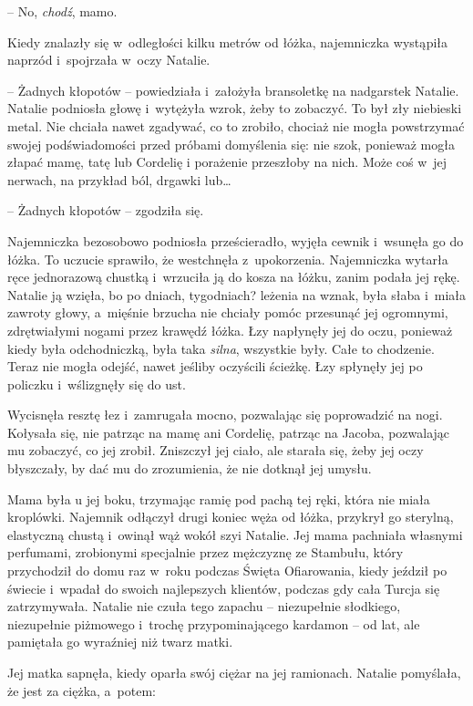 \documentclass[oneside,polish,11pt,sfheadings]{mwbk}
\begin{document}
-- No, \textit{chodź}, mamo.

Kiedy znalazły się w~odległości kilku metrów od łóżka, najemniczka
wystąpiła naprzód i~spojrzała w~oczy Natalie.

-- Żadnych kłopotów -- powiedziała i~założyła bransoletkę na nadgarstek
Natalie. Natalie podniosła głowę i~wytężyła wzrok, żeby to zobaczyć. To
był zły niebieski metal. Nie chciała nawet zgadywać, co to zrobiło,
chociaż nie mogła powstrzymać swojej podświadomości przed próbami
domyślenia się: nie szok, ponieważ mogła złapać mamę, tatę lub Cordelię
i porażenie przeszłoby na nich. Może coś w~jej nerwach, na przykład ból,
drgawki lub\ldots 

-- Żadnych kłopotów -- zgodziła się. 

Najemniczka bezosobowo podniosła
prześcieradło, wyjęła cewnik i~wsunęła go do łóżka. To uczucie sprawiło,
że westchnęła z~upokorzenia. Najemniczka wytarła ręce jednorazową
chustką i~wrzuciła ją do kosza na łóżku, zanim podała jej rękę. Natalie
ją wzięła, bo po dniach, tygodniach? leżenia na wznak, była słaba i~miała zawroty głowy, a~mięśnie brzucha nie chciały pomóc przesunąć jej
ogromnymi, zdrętwiałymi nogami przez krawędź łóżka. Łzy napłynęły jej do
oczu, ponieważ kiedy była odchodniczką, była taka \textit{silna},
wszystkie były. Całe to chodzenie. Teraz nie mogła odejść, nawet jeśliby
oczyścili ścieżkę. Łzy spłynęły jej po policzku i~wślizgnęły się do ust.

Wycisnęła resztę łez i~zamrugała mocno, pozwalając się poprowadzić na
nogi. Kołysała się, nie patrząc na mamę ani Cordelię, patrząc na Jacoba,
pozwalając mu zobaczyć, co jej zrobił. Zniszczył jej ciało, ale starała
się, żeby jej oczy błyszczały, by dać mu do zrozumienia, że nie dotknął
jej umysłu.

Mama była u jej boku, trzymając ramię pod pachą tej ręki, która nie
miała kroplówki. Najemnik odłączył drugi koniec węża od łóżka, przykrył
go sterylną, elastyczną chustą i~owinął wąż wokół szyi Natalie. Jej mama
pachniała własnymi perfumami, zrobionymi specjalnie przez mężczyznę ze
Stambułu, który przychodził do domu raz w~roku podczas Święta
Ofiarowania, kiedy jeździł po świecie i~wpadał do swoich najlepszych
klientów, podczas gdy cała Turcja się zatrzymywała. Natalie nie czuła
tego zapachu -- niezupełnie słodkiego, niezupełnie piżmowego i~trochę
przypominającego kardamon -- od lat, ale pamiętała go wyraźniej niż twarz
matki.

Jej matka sapnęła, kiedy oparła swój ciężar na jej ramionach. Natalie
pomyślała, że jest za ciężka, a~potem: 
\end{document}
